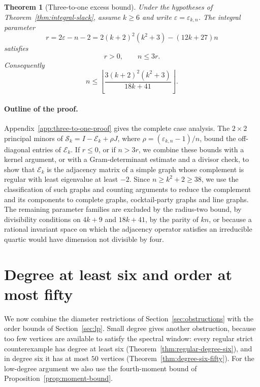 \documentclass[a4paper,10pt,reqno]{amsart}
\theoremstyle{plain}
\newtheorem{theorem}{Theorem}[section]
\theoremstyle{definition}
\theoremstyle{remark}
\newcommand{\resultbox}[1]{\boxed{#1}}
\begin{document}
\begin{theorem}[Three-to-one excess bound]\label{thm:three-to-one}
Under the hypotheses of Theorem~\ref{thm:integral-slack}, assume \(k\ge6\)
and write \(\varepsilon=\varepsilon_{k,n}\).  The integral parameter
\[
 r=2\varepsilon-n-2
   =2(k+2)^2(k^2+3)-(12k+27)n
\]
satisfies
\[
 r>0,\qquad n\le3r.
\]
Consequently
\[
 \resultbox{
 n\le\left\lfloor
 \frac{3(k+2)^2(k^2+3)}{18k+41}
 \right\rfloor.
 }
\]
\end{theorem}

\paragraph{Outline of the proof.}
Appendix~\ref{app:three-to-one-proof} gives the complete case analysis. The
\(2\times2\) principal minors of \(\mathcal S_k=I-\mathcal E_k+\rho J\), where
\(\rho=(\varepsilon_{k,n}-1)/n\), bound the off-diagonal entries of
\(\mathcal E_k\). If \(r\le0\), or if \(n>3r\), we combine these bounds with a
kernel argument, or with a Gram-determinant estimate and a divisor check, to
show that \(\mathcal E_k\) is the adjacency matrix of a simple graph whose
complement is regular with least eigenvalue at least \(-2\). Since
\(n\ge k^2+2\ge38\), we use the classification of such graphs
\cite{CameronEtAl1976} and counting arguments to reduce the complement and
its components to complete graphs, cocktail-party graphs and line graphs. The remaining parameter families are
excluded by the radius-two bound, by divisibility conditions on \(4k+9\) and
\(18k+41\), by the parity of \(kn\), or because a rational invariant space on
which the adjacency operator satisfies an irreducible quartic would have
dimension not divisible by four.

\section{Degree at least six and order at most fifty}
\label{sec:degree-six}

We now combine the diameter restrictions of Section~\ref{sec:obstructions}
with the order bounds of Section~\ref{sec:lp}. Small degree gives another
obstruction, because too few vertices are available to satisfy the spectral
window: every regular strict counterexample has degree at least six
(Theorem~\ref{thm:regular-degree-six}), and in degree six it has at most
\(50\) vertices (Theorem~\ref{thm:degree-six-fifty}). For the low-degree
argument we also use the fourth-moment bound of
Proposition~\ref{prop:moment-bound}.
\end{document}
